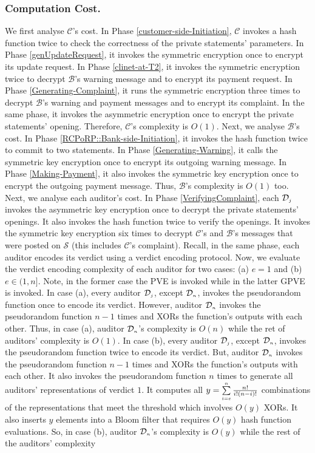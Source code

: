 \subsubsection{Computation Cost.}  We first analyse $\mathcal{C}$'s cost. In Phase \ref{customer-side-Initiation}, $\mathcal{C}$ invokes a hash function twice to check the correctness of the private statements' parameters. In Phase \ref{genUpdateRequest}, it invokes the symmetric encryption once to encrypt its update request. In Phase \ref{clinet-at-T2}, it invokes  the symmetric encryption twice to decrypt $\mathcal{B}$'s warning message and to encrypt its payment request. In Phase \ref{Generating-Complaint}, it runs  the symmetric encryption three times to decrypt $\mathcal{B}$'s warning and payment messages and to encrypt its complaint. In the same phase, it invokes the asymmetric encryption once to encrypt the private statements' opening. Therefore, $\mathcal{C}$'s complexity   is  $O(1)$. Next, we analyse $\mathcal{B}$'s cost. In Phase \ref{RCPoRP::Bank-side-Initiation}, it invokes the hash function twice to commit  to  two statements. In Phase \ref{Generating-Warning}, it calls the symmetric key encryption once to encrypt its outgoing warning message. In Phase \ref{Making-Payment}, it also invokes  the symmetric key encryption once to encrypt the outgoing payment message. Thus, $\mathcal{B}$'s complexity   is  $O(1)$ too. Next, we analyse each auditor's cost. In Phase \ref{VerifyingComplaint}, each $\mathcal{D}_{\scriptscriptstyle j}$ invokes the asymmetric key encryption once to decrypt the private statements' openings. It also invokes the hash function twice to verify the openings. It invokes the symmetric key encryption six times to decrypt $\mathcal{C}$'s and $\mathcal{B}$'s messages that were posted on $\mathcal{S}$ (this includes $\mathcal{C}$'s complaint). Recall, in the same phase, each auditor encodes its verdict using a verdict encoding protocol. Now, we evaluate the verdict encoding complexity of each auditor for two cases: (a)   $e=1$ and (b) $e\in(1, n]$. Note, in the former case the PVE is invoked while in the latter GPVE is invoked. In case (a), every auditor $\mathcal{D}_{\scriptscriptstyle j}$, except $\mathcal{D}_{\scriptscriptstyle n}$, invokes the pseudorandom function once to encode its verdict. However,  auditor $\mathcal{D}_{\scriptscriptstyle n}$ invokes the pseudorandom function $n-1$ times and XORs the function's outputs with each other. Thus, in  case (a), auditor $\mathcal{D}_{\scriptscriptstyle n}$'s complexity is $O(n)$ while the ret of auditors' complexity is $O(1)$.  In case (b), every auditor $\mathcal{D}_{\scriptscriptstyle j}$, except $\mathcal{D}_{\scriptscriptstyle n}$, invokes the pseudorandom function twice to encode its verdict.  But,  auditor $\mathcal{D}_{\scriptscriptstyle n}$ invokes the pseudorandom function $n-1$ times and XORs the function's outputs with each other. It also invokes  the pseudorandom function $n$ times to generate all auditors' representations of verdict $1$. It computes all $y=\sum\limits_{\scriptscriptstyle i=e}^{\scriptscriptstyle n}\frac{n!}{i!(n- i)!}$ combinations of the representations that meet the threshold which involves $O(y)$ XORs. It also inserts $y$ elements into a Bloom filter that requires  $O(y)$ hash function evaluations. So, in case (b), auditor $\mathcal{D}_{\scriptscriptstyle n}$'s complexity is $O(y)$ while the rest of the auditors' complexity 